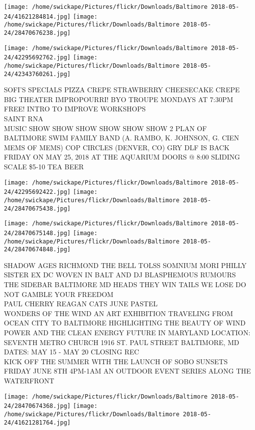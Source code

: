 \documentclass[10pt,letterpaper]{article}
\begin{document}
\texttt{[image: /home/swickape/Pictures/flickr/Downloads/Baltimore 2018-05-24/41621284814.jpg]}
\texttt{[image: /home/swickape/Pictures/flickr/Downloads/Baltimore 2018-05-24/28470676238.jpg]}

\texttt{[image: /home/swickape/Pictures/flickr/Downloads/Baltimore 2018-05-24/42295692762.jpg]}
\texttt{[image: /home/swickape/Pictures/flickr/Downloads/Baltimore 2018-05-24/42343760261.jpg]}

SOFI'S SPECIALS PIZZA CREPE STRAWBERRY CHEESECAKE CREPE\\
BIG THEATER IMPROPOURRI! BYO TROUPE MONDAYS AT 7:30PM FREE! INTRO TO IMPROVE WORKSHOPS\\
SAINT RNA\\
MUSIC SHOW SHOW SHOW SHOW SHOW SHOW 2 PLAN OF BALTIMORE SWIM FAMILY BAND (A. RAMBO, K. JOHNSON, G. CIEN MEMS OF MEMS) COP CIRCLES (DENVER, CO) GRY DLF IS BACK FRIDAY ON MAY 25, 2018 AT THE AQUARIUM DOORS @ 8:00 SLIDING SCALE \$5{-}10 TEA BEER\\
\pagebreak

\texttt{[image: /home/swickape/Pictures/flickr/Downloads/Baltimore 2018-05-24/42295692422.jpg]}
\texttt{[image: /home/swickape/Pictures/flickr/Downloads/Baltimore 2018-05-24/28470675438.jpg]}

\texttt{[image: /home/swickape/Pictures/flickr/Downloads/Baltimore 2018-05-24/28470675148.jpg]}
\texttt{[image: /home/swickape/Pictures/flickr/Downloads/Baltimore 2018-05-24/28470674848.jpg]}

SHADOW AGES RICHMOND THE BELL TOLSS SOMNIUM MORI PHILLY SISTER EX DC WOVEN IN BALT AND DJ BLASPHEMOUS RUMOURS THE SIDEBAR BALTIMORE MD HEADS THEY WIN TAILS WE LOSE DO NOT GAMBLE YOUR FREEDOM\\
PAUL CHERRY REAGAN CATS JUNE PASTEL\\
WONDERS OF THE WIND AN ART EXHIBITION TRAVELING FROM OCEAN CITY TO BALTIMORE HIGHLIGHTING THE BEAUTY OF WIND POWER AND THE CLEAN ENERGY FUTURE IN MARYLAND LOCATION: SEVENTH METRO CHURCH 1916 ST. PAUL STREET BALTIMORE, MD DATES: MAY 15 {-} MAY 20 CLOSING REC\\
KICK OFF THE SUMMER WITH THE LAUNCH OF SOBO SUNSETS FRIDAY JUNE 8TH 4PM{-}1AM AN OUTDOOR EVENT SERIES ALONG THE WATERFRONT\\
\pagebreak

\texttt{[image: /home/swickape/Pictures/flickr/Downloads/Baltimore 2018-05-24/28470674368.jpg]}
\texttt{[image: /home/swickape/Pictures/flickr/Downloads/Baltimore 2018-05-24/41621281764.jpg]}
\end{document}
